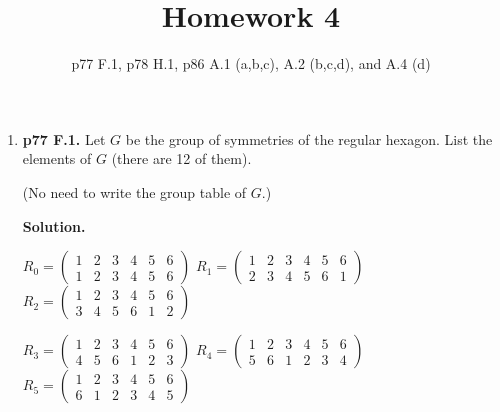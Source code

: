 \documentclass[11pt]{article}
\begin{document}
\title{Homework 4}
\date{p77 F.1, p78 H.1, p86 A.1 (a,b,c), A.2 (b,c,d), and A.4 (d)}
\maketitle

\thispagestyle{fancy}
\pagestyle{fancy}

\begin{enumerate}

\item {\bfseries p77 F.1.} Let $G$ be the group of symmetries of the regular hexagon. List the elements of $G$ (there are 12 of them).
	\begin{center}
	\end{center}

	(No need to write the group table of $G$.)
  
	{\bfseries Solution.}
	
	$R_0 = \begin{pmatrix}
		1 & 2 & 3 & 4 & 5 & 6 \\
		1 & 2 & 3 & 4 & 5 & 6
	\end{pmatrix}$
	$R_1 = \begin{pmatrix}
		1 & 2 & 3 & 4 & 5 & 6 \\
		2 & 3 & 4 & 5 & 6 & 1
	\end{pmatrix}$
	$R_2 = \begin{pmatrix}
		1 & 2 & 3 & 4 & 5 & 6 \\
		3 & 4 & 5 & 6 & 1 & 2
	\end{pmatrix}$
	
	$R_3 = \begin{pmatrix}
		1 & 2 & 3 & 4 & 5 & 6 \\
		4 & 5 & 6 & 1 & 2 & 3
	\end{pmatrix}$
	$R_4 = \begin{pmatrix}
		1 & 2 & 3 & 4 & 5 & 6 \\
		5 & 6 & 1 & 2 & 3 & 4
	\end{pmatrix}$
	$R_5 = \begin{pmatrix}
		1 & 2 & 3 & 4 & 5 & 6 \\
		6 & 1 & 2 & 3 & 4 & 5
	\end{pmatrix}$
	

\end{enumerate}
\end{document}
